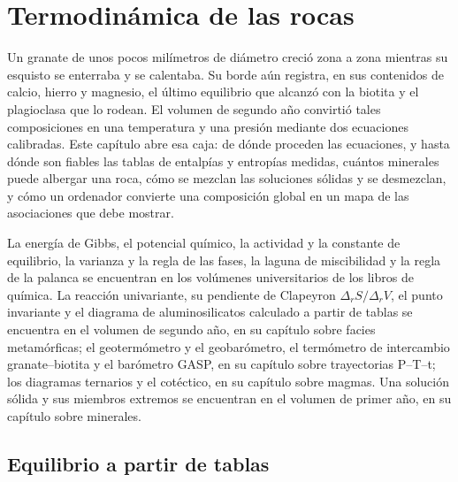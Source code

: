\chapter{Termodinámica de las rocas}\label{ch:b3:petrological-thermodynamics}

Un granate de unos pocos milímetros de diámetro creció zona a zona mientras su esquisto se enterraba
y se calentaba. Su borde aún registra, en sus contenidos de calcio, hierro y magnesio, el
último equilibrio que alcanzó con la biotita y el plagioclasa que lo rodean. El
volumen de segundo año convirtió tales composiciones en una temperatura y una presión mediante
dos ecuaciones calibradas. Este capítulo abre esa caja: de dónde proceden las ecuaciones,
y hasta dónde son fiables las tablas de entalpías y entropías medidas,
cuántos minerales puede albergar una roca, cómo se mezclan las soluciones sólidas y
se desmezclan, y cómo un ordenador convierte una composición global en un mapa de las
asociaciones que debe mostrar.

\begin{recall}
La energía de Gibbs, el potencial químico, la actividad y la constante de
equilibrio, la varianza y la regla de las fases, la laguna de miscibilidad y la
regla de la palanca se encuentran en los volúmenes universitarios de los libros de química. La reacción univariante,
su pendiente de Clapeyron $\Delta_rS/\Delta_rV$, el punto invariante y el
diagrama de aluminosilicatos calculado a partir de tablas se encuentra en el volumen de segundo año, en su
capítulo sobre facies metamórficas; el geotermómetro y el geobarómetro, el
termómetro de intercambio granate--biotita y el barómetro GASP, en su capítulo sobre
trayectorias P--T--t; los diagramas ternarios y el cotéctico, en su capítulo sobre magmas. Una
solución sólida y sus miembros extremos se encuentran en el volumen de primer año, en su capítulo sobre
minerales.
\end{recall}

\section{Equilibrio a partir de tablas}\label{sec:b3:petrological-thermodynamics:tables}

